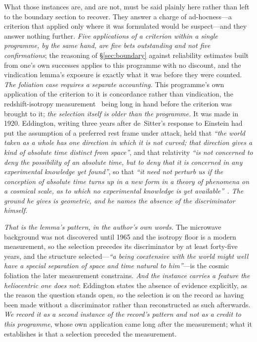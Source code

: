 \documentclass[11pt,a4paper]{article}
\begin{document}
What those instances are, and are not, must be said plainly here rather than left to the boundary section to recover. They answer a charge of ad-hocness---a criterion that applied only where it was formulated would be suspect---and they answer nothing further. \emph{Five applications of a criterion within a single programme, by the same hand, are five bets outstanding and not five confirmations}; the reasoning of \S\ref{sec:boundary} against reliability estimates built from one's own successes applies to this programme with no discount, and the vindication lemma's exposure is exactly what it was before they were counted. \emph{The foliation case requires a separate accounting.} This programme's own application of the criterion
to it is concordance rather than vindication, the redshift-isotropy
measurement~\cite{JanzenModernParallax} being long in hand before the criterion was brought to it; \emph{the
selection itself is older than the programme.} It was made in 1920. Eddington,
writing three years after de~Sitter's response to Einstein had put the assumption of a preferred rest frame
under attack, held that \emph{``the world taken as a whole has one direction in which it is not curved; that
direction gives a kind of absolute time distinct from space''}, and that relativity \emph{``is not concerned to
deny the possibility of an absolute time, but to deny that it is concerned in any experimental knowledge yet
found''}, so that \emph{``it need not perturb us if the conception of absolute time turns up in a new form in a
theory of phenomena on a cosmical scale, as to which no experimental knowledge is yet
available''}~\cite{Eddington1920}. \emph{The ground he gives is geometric, and he names the absence of the
discriminator himself.}

\emph{That is the lemma's pattern, in the author's own words.} The microwave background was not discovered
until 1965 and the isotropy floor is a modern measurement, so the selection precedes its discriminator by at
least forty-five years, and the structure selected---\emph{``a being coextensive with the world might well have
a special separation of space and time natural to him''}---is the cosmic foliation the later measurement
constrains. \emph{And the instance carries a feature the heliocentric one does not}: Eddington states the absence of evidence explicitly, as the reason the question stands open, so the selection is on the record as having been made without a discriminator rather than reconstructed as such afterwards. \emph{We record it as a second instance of the record's pattern and not as a
credit to this programme}, whose own application came long after the measurement; what it establishes is that a selection
preceded the measurement.
\end{document}
